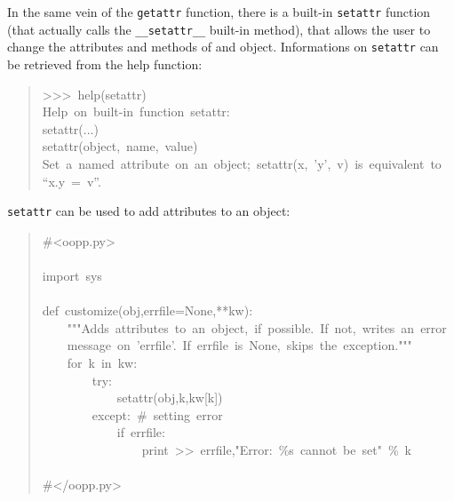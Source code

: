 \documentclass[10pt,english]{article}
\begin{document}
In the same vein of the \texttt{getattr} function, there is a built-in
\texttt{setattr} function (that actually calls the \texttt{{\_}{\_}setattr{\_}{\_}} built-in
method), that allows the user to change the attributes and methods of
and object. Informations on \texttt{setattr} can be retrieved from the help 
function:
\begin{quote}
\begin{ttfamily}\begin{flushleft}
\mbox{>>>~help(setattr)}\\
\mbox{Help~on~built-in~function~setattr:}\\
\mbox{setattr(...)}\\
\mbox{setattr(object,~name,~value)}\\
\mbox{Set~a~named~attribute~on~an~object;~setattr(x,~'y',~v)~is~equivalent~to}\\
\mbox{``x.y~=~v''.}
\end{flushleft}\end{ttfamily}
\end{quote}

\texttt{setattr} can be used to add attributes to an object:
\begin{quote}
\begin{ttfamily}\begin{flushleft}
\mbox{{\#}<oopp.py>}\\
\mbox{}\\
\mbox{import~sys}\\
\mbox{}\\
\mbox{def~customize(obj,errfile=None,**kw):}\\
\mbox{~~~~"""Adds~attributes~to~an~object,~if~possible.~If~not,~writes~an~error}\\
\mbox{~~~~message~on~'errfile'.~If~errfile~is~None,~skips~the~exception."""}\\
\mbox{~~~~for~k~in~kw:}\\
\mbox{~~~~~~~~try:~}\\
\mbox{~~~~~~~~~~~~setattr(obj,k,kw[k])}\\
\mbox{~~~~~~~~except:~{\#}~setting~error}\\
\mbox{~~~~~~~~~~~~if~errfile:}\\
\mbox{~~~~~~~~~~~~~~~~print~>>~errfile,"Error:~{\%}s~cannot~be~set"~{\%}~k}\\
\mbox{}\\
\mbox{{\#}</oopp.py>}
\end{flushleft}\end{ttfamily}
\end{quote}
\end{document}

